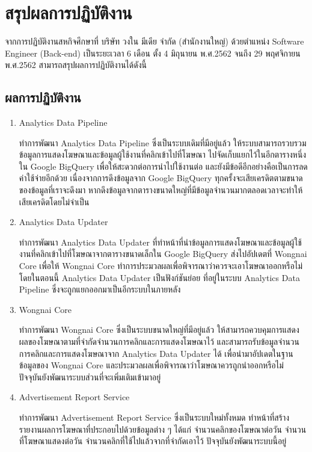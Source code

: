 \chapter{สรุปผลการปฏิบัติงาน}
\label{chapter:summary-result}

 จากการปฏิบัติงานสหกิจศึกษาที่ บริษัท วงใน มีเดีย จำกัด (สำนักงานใหญ่) ด้วยตำแหน่ง Software Engineer (Back-end) เป็นระยะเวลา 6 เดือน ตั้ง 4 มิถุนายน พ.ศ.2562 จนถึง 29 พฤศจิกายน พ.ศ.2562 สามารถสรุปผลการปฏิบัติงานได้ดังนี้
 
 \section{ผลการปฏิบัติงาน}
 \begin{enumerate}
 	\item Analytics Data Pipeline
 	
 	ทำการพัฒนา Analytics Data Pipeline ซึ่งเป็นระบบเดิมที่มีอยู่แล้ว  ให้ระบบสามารถรวบรวมข้อมูลการแสดงโฆษณาและข้อมูลผู้ใช้งานที่คลิกเข้าไปที่โฆษณา ไปจัดเก็บแยกไว้ในอีกตารางหนึ่งใน Google BigQuery เพื่อให้สะดวกต่อการนำไปใช้งานต่อ และยังมีข้อดีอีกอย่างคือเป็นการลดค่าใช้จ่ายอีกด้วย เนื่องจากการดึงข้อมูลจาก Google BigQuery ทุกครั้งจะเสียเครดิตตามขนาดของข้อมูลที่เราจะดึงมา หากดึงข้อมูลจากตารางขนาดใหญ่ที่มีข้อมูลจำนวนมากตลอดเวลาจะทำให้เสียเครดิตโดยไม่จำเป็น
 	
 	\item Analytics Data Updater
 	
 	ทำการพัฒนา Analytics Data Updater ที่ทำหน้าที่นำข้อมูลการแสดงโฆษณาและข้อมูลผู้ใช้งานที่คลิกเข้าไปที่โฆษณาจากตารางขนาดเล็กใน Google BigQuery ส่งไปอัปเดตที่ Wongnai Core เพื่อให้ Wongnai Core ทำการประมวลผลเพื่อพิจารณาว่าควรจะเอาโฆษณาออกหรือไม่ โดยในตอนนี้ Analytics Data Updater เป็นฟังก์ชันย่อย ที่อยู่ในระบบ  Analytics Data Pipeline ซึ่งจะถูกแยกออกมาเป็นอีกระบบในภายหลัง
 	
 	\item Wongnai Core
 	
 	ทำการพัฒนา Wongnai Core ซึ่งเป็นระบบขนาดใหญ่ที่มีอยู่แล้ว  ให้สามารถควบคุมการแสดงผลของโฆษณาตามที่จำกัดจำนวนการคลิกและการแสดงโฆษณาไว้ และสามารถรับข้อมูลจำนวนการคลิกและการแสดงโฆษณาจาก Analytics Data Updater ได้ เพื่อนำมาอัปเดตในฐานข้อมูลของ Wongnai Core และประมวลผลเพื่อพิจารณาว่าโฆษณาควรถูกนำออกหรือไม่ ปัจจุบันยังพัฒนาระบบส่วนที่จะเพิ่มเติมเข้ามาอยู่
 	
 	\item Advertisement Report Service
 	
 	ทำการพัฒนา Advertisement Report Service ซึ่งเป็นระบบใหม่ทั้งหมด ทำหน้าที่สร้างรายงานผลการโฆษณาที่ประกอบไปด้วยข้อมูลต่าง ๆ ได้แก่ จำนวนคลิกของโฆษณาต่อวัน จำนวนที่โฆษณาแสดงต่อวัน จำนวนคลิกที่ใช้ไปแล้วจากที่จำกัดเอาไว้ ปัจจุบันยังพัฒนาระบบนี้อยู่
 \end{enumerate}

